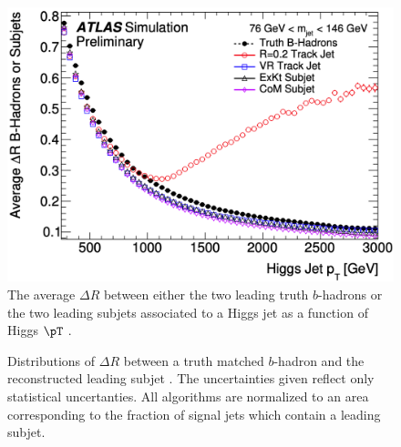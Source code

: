 \begin{figure}[!htbp]
  \centering
  \includegraphics[width=0.98\linewidth]{figures/objects/average_deltaR}

  \caption{The average $\Delta R$ between either
the two leading truth $b$-hadrons or the two leading subjets associated to a
Higgs jet as a function of Higgs $\pT$ \cite{ATL-PHYS-PUB-2017-010}.}
  \label{sec:objects:average_deltaR}
\end{figure}

\begin{figure}[!htbp]
  \centering
   \hfill
  \caption{Distributions of $\Delta R$ between a truth matched $b$-hadron and
the reconstructed leading subjet \cite{ATL-PHYS-PUB-2017-010}.  The
uncertainties given reflect only statistical uncertanties.  All algorithms are
normalized to an area corresponding to the fraction of signal jets which
contain a leading subjet.} 
  \label{sec:objects:leading_vr}
\end{figure}

